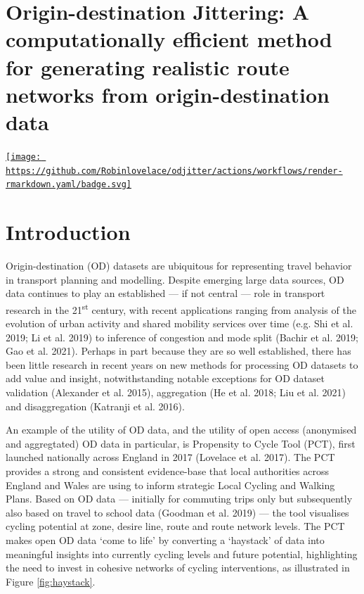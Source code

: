\documentclass[
]{article}
\author{}
\date{\vspace{-2.5em}}
\begin{document}
{
\setcounter{tocdepth}{2}
\tableofcontents
}
\hypertarget{origin-destination-jittering-a-computationally-efficient-method-for-generating-realistic-route-networks-from-origin-destination-data}{%
\section{Origin-destination Jittering: A computationally efficient method for generating realistic route networks from origin-destination data}\label{origin-destination-jittering-a-computationally-efficient-method-for-generating-realistic-route-networks-from-origin-destination-data}}

\href{https://github.com/Robinlovelace/odjitter/actions/workflows/render-rmarkdown.yaml}{\texttt{[image: https://github.com/Robinlovelace/odjitter/actions/workflows/render-rmarkdown.yaml/badge.svg]}}

\hypertarget{introduction}{%
\section{Introduction}\label{introduction}}

Origin-destination (OD) datasets are ubiquitous for representing travel behavior in transport planning and modelling.
Despite emerging large data sources, OD data continues to play an established --- if not central --- role in transport research in the 21\textsuperscript{st} century, with recent applications ranging from analysis of the evolution of urban activity and shared mobility services over time (e.g. Shi et al. 2019; Li et al. 2019) to inference of congestion and mode split (Bachir et al. 2019; Gao et al. 2021).
Perhaps in part because they are so well established, there has been little research in recent years on new methods for processing OD datasets to add value and insight, notwithstanding notable exceptions for OD dataset validation (Alexander et al. 2015), aggregation (He et al. 2018; Liu et al. 2021) and disaggregation (Katranji et al. 2016).

An example of the utility of OD data, and the utility of open access (anonymised and aggregtated) OD data in particular, is Propensity to Cycle Tool (PCT), first launched nationally across England in 2017 (Lovelace et al. 2017).
The PCT provides a strong and consistent evidence-base that local authorities across England and Wales are using to inform strategic Local Cycling and Walking Plans.
Based on OD data --- initially for commuting trips only but subsequently also based on travel to school data (Goodman et al. 2019) --- the tool visualises cycling potential at zone, desire line, route and route network levels.
The PCT makes open OD data `come to life' by converting a `haystack' of data into meaningful insights into currently cycling levels and future potential, highlighting the need to invest in cohesive networks of cycling interventions, as illustrated in Figure \ref{fig:haystack}.
\end{document}
